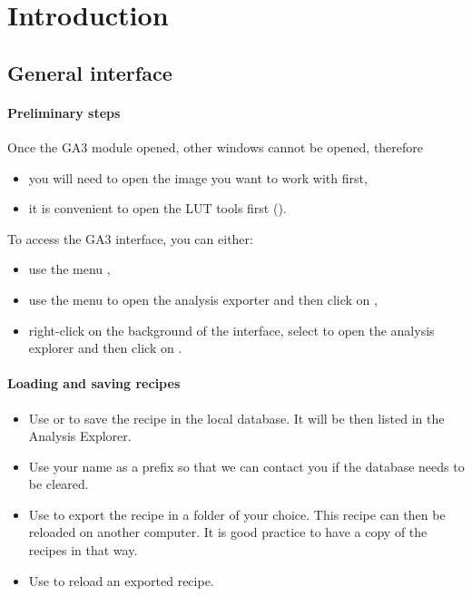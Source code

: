 \section{Introduction}

\subsection{General interface}

\paragraph{Preliminary steps}
Once the GA3 module opened, other windows cannot be opened, therefore
\begin{itemize}
    \item you will need to open the image you want to work with first,
    \item it is convenient to open the LUT tools first ().
\end{itemize}
To access the GA3 interface, you can either:
\begin{itemize}
    \item use the menu ,
    \item use the menu  to open the analysis exporter and then click on ,
    \item right-click on the background of the interface, select  to open the analysis explorer and then click on .
\end{itemize}

\paragraph{Loading and saving recipes}

\begin{itemize}
    \item Use  or  to save the recipe in the local database. It will be then listed in the Analysis Explorer.
    \item Use your name as a prefix so that we can contact you if the database needs to be cleared.
    \item Use  to export the recipe in a folder of your choice. This recipe can then be reloaded on another computer. It is good practice to have a copy of the recipes in that way.
    \item Use  to reload an exported recipe. 
\end{itemize}

